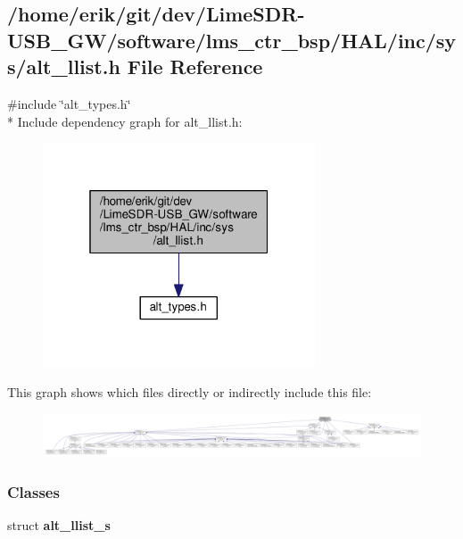 \subsection{/home/erik/git/dev/\+Lime\+S\+D\+R-\/\+U\+S\+B\+\_\+\+G\+W/software/lms\+\_\+ctr\+\_\+bsp/\+H\+A\+L/inc/sys/alt\+\_\+llist.h File Reference}
\label{alt__llist_8h}
{\ttfamily \#include \char`\"{}alt\+\_\+types.\+h\char`\"{}}\\*
Include dependency graph for alt\+\_\+llist.\+h\+:
\nopagebreak
\begin{figure}[H]
\begin{center}
\leavevmode
\includegraphics[width=229pt]{d6/d3a/alt__llist_8h__incl}
\end{center}
\end{figure}
This graph shows which files directly or indirectly include this file\+:
\nopagebreak
\begin{figure}[H]
\begin{center}
\leavevmode
\includegraphics[width=350pt]{df/d2e/alt__llist_8h__dep__incl}
\end{center}
\end{figure}
\subsubsection*{Classes}
\begin{DoxyCompactItemize}
\item 
struct {\bf alt\+\_\+llist\+\_\+s}
\end{DoxyCompactItemize}
